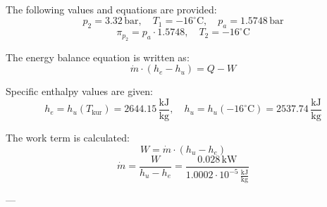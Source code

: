 The following values and equations are provided:  
\[
p_2 = 3.32 \, \text{bar}, \quad T_1 = -16^\circ\text{C}, \quad p_a = 1.5748 \, \text{bar}
\]  
\[
\pi_{p_2} = p_a \cdot 1.5748, \quad T_2 = -16^\circ\text{C}
\]  

The energy balance equation is written as:  
\[
\dot{m} \cdot (h_e - h_u) = Q - W
\]  

Specific enthalpy values are given:  
\[
h_e = h_u(T_{\text{kur}}) = 2644.15 \, \frac{\text{kJ}}{\text{kg}}, \quad h_u = h_u(-16^\circ\text{C}) = 2537.74 \, \frac{\text{kJ}}{\text{kg}}
\]  

The work term is calculated:  
\[
W = \dot{m} \cdot (h_u - h_e)
\]  
\[
\dot{m} = \frac{W}{h_u - h_e} = \frac{0.028 \, \text{kW}}{1.0002 \cdot 10^{-5} \, \frac{\text{kJ}}{\text{kg}}}
\]  

---